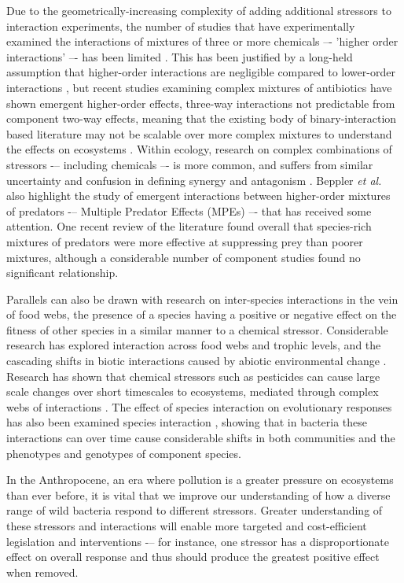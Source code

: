 \documentclass[final,1p,times]{elsarticle}
\begin{document}
Due to the geometrically-increasing complexity of adding additional stressors to interaction experiments, the number of studies that have experimentally examined the interactions of mixtures of three or more chemicals –- 'higher order interactions' –- has been limited \cite{Beppler2016}. This has been justified by a long-held assumption that higher-order interactions are negligible compared to lower-order interactions \cite{Tekin2017a}, but recent studies examining complex mixtures of antibiotics have shown emergent higher-order effects,  three-way interactions not predictable from component two-way effects, meaning that the existing body of binary-interaction based literature may not be scalable over more complex mixtures to understand the effects on ecosystems \cite{Tekin2016, Zimmer2016, Tekin2017}. Within ecology, research on complex combinations of stressors -– including chemicals –- is more common, and suffers from similar uncertainty and confusion in defining synergy and antagonism \cite{Cote2016}.  Beppler \textit{et al.} also highlight the study of emergent interactions between higher-order mixtures of predators -– Multiple Predator Effects (MPEs) –- that has received some attention. One recent review of the literature \cite{Griffin2013EffectsMeta-analysis} found overall that species-rich mixtures of predators were more effective at suppressing prey than poorer mixtures, although a considerable number of component studies found no significant relationship. 

Parallels can also be drawn with research on inter-species interactions in the vein of food webs, the presence of a species having a positive or negative effect on the fitness of other species in a similar manner to a chemical stressor. Considerable research has explored interaction across food webs and trophic levels, and the  cascading shifts in biotic interactions caused by abiotic environmental change \cite{Hooper2005,Parmesan2006,Chesson2000}. Research has shown that chemical stressors such as pesticides can cause large scale changes over short timescales to ecosystems, mediated through complex webs of interactions \cite{Thompson2016}. The effect of species interaction on evolutionary responses has also been examined species interaction \cite{Lawrence2012}, showing that in bacteria these interactions can over time cause considerable shifts in both communities and the phenotypes and genotypes of component species.

In the Anthropocene, an era where pollution is a greater pressure on ecosystems than ever before, it is vital that we improve our understanding of how a diverse range of wild bacteria respond to different stressors. Greater understanding of these stressors and interactions will enable more targeted and cost-efficient legislation and interventions -– for instance, one stressor has a disproportionate effect on overall response and thus should produce the greatest positive effect when removed. 
\end{document}
